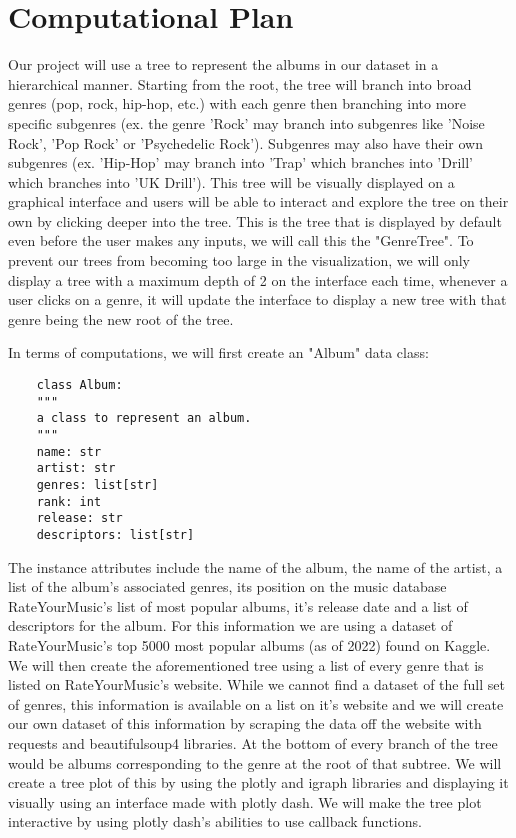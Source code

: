 \documentclass[fontsize=11pt]{article}
\begin{document}
\section*{Computational Plan}
Our project will use a tree to represent the albums in our dataset in a hierarchical manner. Starting from the root, the tree will branch into broad genres (pop, rock, hip-hop, etc.) with each genre then branching into more specific subgenres (ex. the genre 'Rock' may branch into subgenres like 'Noise Rock', 'Pop Rock' or 'Psychedelic Rock'). Subgenres may also have their own subgenres (ex. 'Hip-Hop' may branch into 'Trap' which branches into 'Drill' which branches into 'UK Drill'). This tree will be visually displayed on a graphical interface and users will be able to interact and explore the tree on their own by clicking deeper into the tree. This is the tree that is displayed by default even before the user makes any inputs, we will call this the "GenreTree". To prevent our trees from becoming too large in the visualization, we will only display a tree with a maximum depth of 2 on the interface each time, whenever a user clicks on a genre, it will update the interface to display a new tree with that genre being the new root of the tree.

In terms of computations, we will first create an "Album" data class:
\begin{verbatim}
	class Album:
    """
    a class to represent an album.
    """
    name: str
    artist: str  
    genres: list[str]
    rank: int
    release: str
    descriptors: list[str]
\end{verbatim}
The instance attributes include the name of the album, the name of the artist, a list of the album's associated genres, its position on the music database RateYourMusic's list of most popular albums, it's release date and a list of descriptors for the album. For this information we are using a dataset of RateYourMusic's top 5000 most popular albums (as of 2022) found on Kaggle. We will then create the aforementioned tree using a list of every genre that is listed on RateYourMusic's website. While we cannot find a dataset of the full set of genres, this information is available on a list on it's website and we will create our own dataset of this information by scraping the data off the website with requests and beautifulsoup4 libraries. At the bottom of every branch of the tree would be albums corresponding to the genre at the root of that subtree. We will create a tree plot of this by using the plotly and igraph libraries and displaying it visually using an interface made with plotly dash. We will make the tree plot interactive by using plotly dash's abilities to use callback functions. \newline
 
\end{document}
